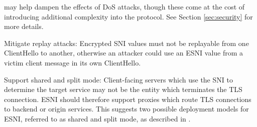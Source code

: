 \documentclass[twoside]{article}
\theoremstyle{definition}
\begin{document}
\begin{compactitem}
  may help dampen the effects of DoS attacks, though these come at the cost of introducing
  additional complexity into the protocol. See Section \ref{sec:security} for more details.
  \item Mitigate replay attacks: Encrypted SNI values must not be replayable from one 
  ClientHello to another, otherwise an attacker could use an ESNI value from a victim client
  message in its own ClientHello.
  \item Support shared and split mode: Client-facing servers which use the SNI to determine 
  the target service may not be the entity which terminates the TLS connection. ESNI should therefore
  support proxies which route TLS connections to backend or origin services. This suggests two
  possible deployment models for ESNI, referred to as shared and split mode, as described in
  \cite{ietf-tls-esni-04}.
\end{compactitem}
%


\end{document}
